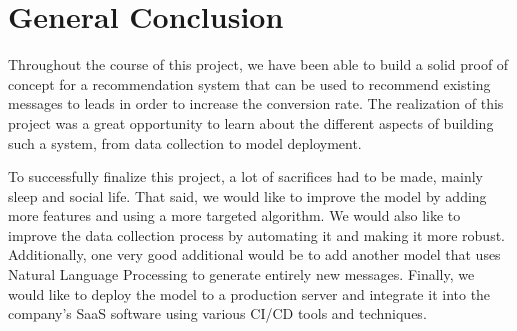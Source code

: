 \thispagestyle{plain} %
\section*{General Conclusion}

Throughout the course of this project, we have been able to build a solid proof of concept for a recommendation system that can be used to recommend
existing messages to leads in order to increase the conversion rate.
The realization of this project was a great opportunity to learn about the different aspects of building such a system, from data collection to model deployment.

To successfully finalize this project, a lot of sacrifices had to be made, mainly sleep and social life.
That said, we would like to improve the model by adding more features and using a more targeted algorithm.
We would also like to improve the data collection process by automating it and making it more robust.
Additionally, one very good additional would be to add another model that uses Natural Language Processing to generate entirely new messages.
Finally, we would like to deploy the model to a production server and integrate it into the company's SaaS software using various CI/CD tools and techniques.
